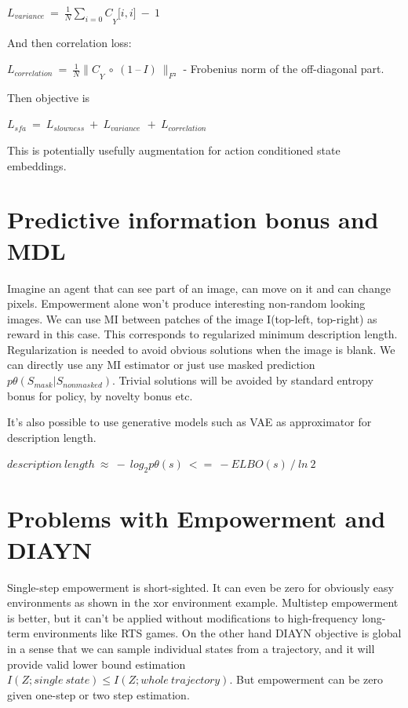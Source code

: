 $L_{variance}\  = \ {\frac{1}{N}\sum_{i = 0}^{}C}_{Y}\lbrack i,i\rbrack\  - \ 1$

And then correlation loss:

$L_{correlation}\  = \ {\frac{1}{N}\| C}_{Y}\  \circ \ (1\ –\ I)\ \|_{F²}$ - Frobenius norm of the off-diagonal part.

Then objective is

$L_{sfa}\  = \ L_{slowness}\  + \ L_{variance\ }\  + \ L_{correlation}$


This is potentially usefully augmentation for action conditioned state embeddings.

\section{Predictive information bonus and MDL}\label{predictive-information-bonus-and-mdl}

Imagine an agent that can see part of an image, can move on it and can change pixels. Empowerment alone won't produce interesting non-random looking images. We can use MI between patches of the image I(top-left, top-right) as reward in this case. This corresponds to regularized minimum description length. Regularization is needed to avoid obvious solutions when the image is blank. We can directly use any MI estimator or just use masked prediction $p\theta(S_{mask}|S_{nonmasked})$. Trivial solutions will be avoided by standard entropy bonus for policy, by novelty bonus etc.

It's also possible to use generative models such as VAE as approximator for description length.

$description\ length\  \approx \  - \ log_{2}p\theta(s)\  < = \  - ELBO(s)\ /\ ln\ 2\ $

\section{Problems with Empowerment and DIAYN}\label{problems-with-empowerment-and-diayn}

Single-step empowerment is short-sighted. It can even be zero for obviously easy environments as shown in the xor environment example. Multistep empowerment is better, but it can't be applied without modifications to high-frequency long-term environments like RTS games. On the other hand DIAYN objective is global in a sense that we can sample individual states from a trajectory, and it will provide valid lower bound estimation $I(Z ; single\ state) ≤ I(Z ; whole\ trajectory)$. But empowerment can be zero given one-step or two step estimation.

